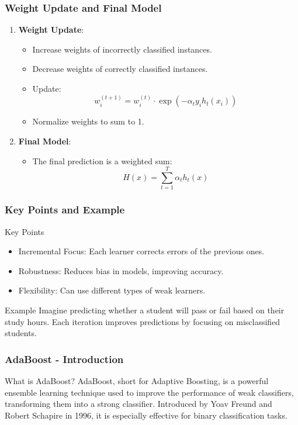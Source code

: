\documentclass[aspectratio=169]{beamer}
\begin{document}
\begin{frame}[fragile]
  \frametitle{Weight Update and Final Model}
  \begin{enumerate}
    \item \textbf{Weight Update}:
      \begin{itemize}
        \item Increase weights of incorrectly classified instances.
        \item Decrease weights of correctly classified instances.
        \item Update:
        \begin{equation}
          w_{i}^{(t+1)} = w_{i}^{(t)} \cdot \exp(-\alpha_t y_i h_t(x_i))
        \end{equation}
        \item Normalize weights to sum to 1.
      \end{itemize}
    \item \textbf{Final Model}:
      \begin{itemize}
        \item The final prediction is a weighted sum:
        \begin{equation}
          H(x) = \sum_{t=1}^{T} \alpha_t h_t(x)
        \end{equation}
      \end{itemize}
  \end{enumerate}
\end{frame}

\begin{frame}[fragile]
  \frametitle{Key Points and Example}
  \begin{block}{Key Points}
    \begin{itemize}
      \item Incremental Focus: Each learner corrects errors of the previous ones.
      \item Robustness: Reduces bias in models, improving accuracy.
      \item Flexibility: Can use different types of weak learners.
    \end{itemize}
  \end{block}
  \begin{block}{Example}
    Imagine predicting whether a student will pass or fail based on their study hours. Each iteration improves predictions by focusing on misclassified students.
  \end{block}
\end{frame}

\begin{frame}[fragile]
    \frametitle{AdaBoost - Introduction}
    \begin{block}{What is AdaBoost?}
        AdaBoost, short for Adaptive Boosting, is a powerful ensemble learning technique used to improve the performance of weak classifiers, transforming them into a strong classifier. Introduced by Yoav Freund and Robert Schapire in 1996, it is especially effective for binary classification tasks.
    \end{block}
\end{frame}
\end{document}
